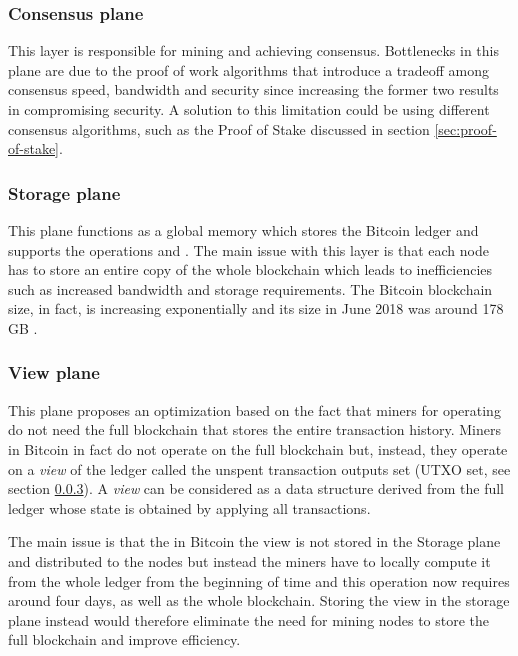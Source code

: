 \subsubsection{Consensus plane} This layer is responsible for mining and
achieving consensus. Bottlenecks in this plane are due to the proof of work
algorithms that introduce a tradeoff among consensus speed, bandwidth and
security since increasing the former two results in compromising security.
A solution to this limitation could be using different consensus algorithms, such
as the Proof of Stake discussed in section \ref{sec:proof-of-stake}.


\subsubsection{Storage plane} This plane functions as a global memory which
stores the Bitcoin ledger and supports the operations  and
. The main issue with this layer is that each node has to store an
entire copy of the whole blockchain which leads to inefficiencies such as
increased bandwidth and storage requirements. The Bitcoin blockchain size, in
fact, is increasing exponentially and its size in June 2018 was around 178 GB
\cite{statista}.


\subsubsection{View plane} This plane proposes an optimization based on the fact
that miners for operating do not need the full blockchain that stores the entire
transaction history. Miners in Bitcoin in fact do not operate on the full
blockchain but, instead, they operate on a \emph{view} of the ledger called the
unspent transaction outputs set (UTXO set, see section \ref{}). A \emph{view}
can be considered as a data structure derived from the full ledger whose state
is obtained by applying all transactions.

The main issue is that the in Bitcoin the view is not stored in the Storage
plane and distributed to the nodes but instead the miners have to locally
compute it from the whole ledger from the beginning of time and this operation
now requires around four days, as well as the whole blockchain. Storing the
view in the storage plane instead would therefore eliminate the need for
mining nodes to store the full blockchain and improve efficiency.


